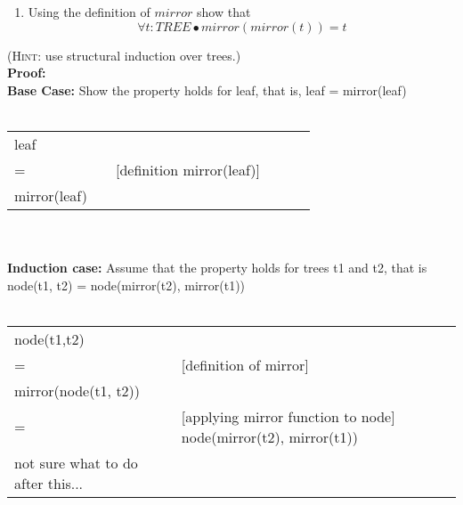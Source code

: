 \documentclass{article}
\begin{document}
\begin{enumerate}[\bf I.]
\begin{enumerate}
\item Using the definition of $mirror$ show that
\[\forall t: TREE \bullet mirror(mirror(t)) = t\]
\end{enumerate}
(\textsc{Hint}: use structural induction over trees.)
\\
\textbf{Proof:}\\
\textbf{Base Case:} Show the property holds for leaf, that is, leaf = mirror(leaf) \\
\\
\begin{tabular}{l ll lll}
     leaf &    &  \\
     = &   & [definition mirror(leaf)] \\
     mirror(leaf) & &  \\
\end{tabular} \\
\\
\textbf{Induction case:} Assume that the property holds for trees t1 and t2, that is node(t1, t2) = node(mirror(t2), mirror(t1)) \\
\\
\begin{tabular}{l ll lll}
     node(t1,t2) &    &  \\
     = &   & [definition of mirror] \\
     mirror(node(t1, t2)) & & \\
     = &   & [applying mirror function to node] 
     node(mirror(t2), mirror(t1)) & & \\
     not sure what to do after this... \\
\end{tabular} \\
\\

\end{enumerate}
\end{document}
